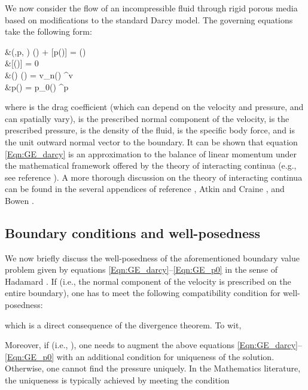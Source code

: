 \documentclass[11pt,reqno]{amsart}
\begin{document}
We now consider the flow of an incompressible fluid 
through rigid porous media based on modifications to 
the standard Darcy model. The governing equations take 
the following form: 

    \label{Eqn:GE_darcy}
    &\alpha(,p, ) () + 
    [p()] = \rho {}() 
    \quad {} \; \Omega \\
\label{Eqn:GE_Continuity}
    &[()] = 0 \quad {} 
    \; \Omega \\
\label{Eqn:GE_Vn}
    &() \cdot {}() = 
    v_{n}() \quad {} \; \Gamma^{v} \\
\label{Eqn:GE_p0}
    &p() = p_0() \quad {} 
    \; \Gamma^{p}
  
where  is the drag coefficient (which can depend 
on the velocity and pressure, and can spatially vary), 
 is the prescribed normal component of 
the velocity,  is the prescribed pressure, 
 is the density of the fluid,  
is the specific body force, and  
is the unit outward normal vector to the boundary. 
It can be shown that equation \eqref{Eqn:GE_darcy} is an 
approximation to the balance of linear momentum under the 
mathematical framework offered by the theory of interacting 
continua (e.g., see reference \cite[Introduction]
{Nakshatrala_Rajagopal_IJNMF_2011_v67_p342}). 
A more thorough discussion on the theory of interacting 
continua can be found in the several appendices of 
reference \cite{Truesdell_rational_thermodynamics}, 
Atkin and Craine \cite{Atkin_Craine_QJMAM_1976_v29_p209}, 
and Bowen \cite{Bowen}. 

\subsection{Boundary conditions and well-posedness}
We now briefly discuss the well-posedness of the 
aforementioned boundary value problem given by 
equations \eqref{Eqn:GE_darcy}--\eqref{Eqn:GE_p0} 
in the sense of Hadamard \cite{McOwen}. If  (i.e., the normal component of the 
velocity is prescribed on the entire boundary), one 
has to meet the following compatibility condition 
for well-posedness:

which is a direct consequence of the divergence theorem. 
To wit, 

Moreover, if  (i.e., ), one needs to augment the above 
equations \eqref{Eqn:GE_darcy}--\eqref{Eqn:GE_p0} with 
an additional condition for uniqueness of the solution. 
Otherwise, one cannot find the pressure uniquely. In 
the Mathematics literature, the uniqueness is typically 
achieved by meeting the condition
\end{document}
